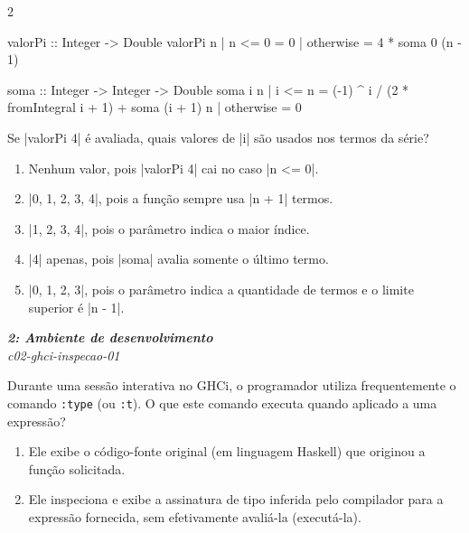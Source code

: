 \documentclass[a4paper,10pt,brazil]{article}
\begin{document}
\begin{multicols}{2}
\begin{haskellcode}
valorPi :: Integer -> Double
valorPi n
  | n <= 0    = 0
  | otherwise = 4 * soma 0 (n - 1)

soma :: Integer -> Integer -> Double
soma i n
  | i <= n    = (-1) ^ i / (2 * fromIntegral i + 1)
                  + soma (i + 1) n
  | otherwise = 0
\end{haskellcode}

Se \haskellinline|valorPi 4| é avaliada, quais valores de \haskellinline|i| são usados nos termos da série?

\begin{enumerate}
  \item Nenhum valor, pois \haskellinline|valorPi 4| cai no caso \haskellinline|n <= 0|.

  \item \haskellinline|0, 1, 2, 3, 4|, pois a função sempre usa \haskellinline|n + 1| termos.

  \item \haskellinline|1, 2, 3, 4|, pois o parâmetro indica o maior índice.

  \item \haskellinline|4| apenas, pois \haskellinline|soma| avalia somente o último termo.

  \item \haskellinline|0, 1, 2, 3|, pois o parâmetro indica a quantidade de termos e o limite superior é \haskellinline|n - 1|.


\end{enumerate}

\begin{flushright}
  \footnotesize
  \textit{\textbf{2: Ambiente de desenvolvimento}}\\
  \textit{c02-ghci-inspecao-01}\\

\end{flushright}
Durante uma sessão interativa no GHCi, o programador utiliza frequentemente o comando \texttt{:type} (ou \texttt{:t}). O que este comando executa quando aplicado a uma expressão?

\begin{enumerate}
  \item Ele exibe o código-fonte original (em linguagem Haskell) que originou a função solicitada.

  \item Ele inspeciona e exibe a assinatura de tipo inferida pelo compilador para a expressão fornecida, sem efetivamente avaliá-la (executá-la).


\end{enumerate}
\end{multicols}
\end{document}
